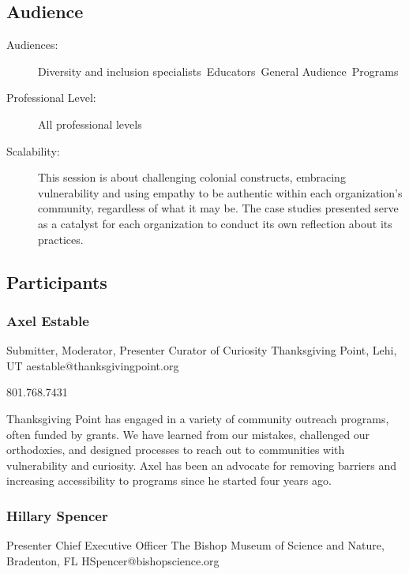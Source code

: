 \documentclass{report}
\begin{document}
              \subsection*{Audience}
                \begin{description}
                  \item [Audiences:]Diversity and inclusion specialists~Educators~General Audience~Programs~
                  \item[Professional Level:]All professional levels~
                \item[Scalability:] This session is about challenging colonial constructs, embracing vulnerability and using empathy to be authentic within each organization’s community, regardless of what it may be. The case studies presented serve as a catalyst for each organization to conduct its own reflection about its practices.

							
              \end{description}
            \subsection*{Participants}
              \subsubsection*{ Axel Estable }
              Submitter, Moderator, Presenter\newline
              Curator of Curiosity\newline
              Thanksgiving Point, Lehi, UT
              \newline
              aestable@thanksgivingpoint.org\newline
              
              801.768.7431\newline

              Thanksgiving Point has engaged in a variety of community outreach programs, often funded by grants. We have learned from our mistakes, challenged our orthodoxies, and designed processes to reach out to communities with vulnerability and curiosity. Axel has been an advocate for removing barriers and increasing accessibility to programs since he started four years ago.\newline


              

              
                \subsubsection*{ Hillary Spencer }
                Presenter\newline
                Chief Executive Officer\newline
                The Bishop Museum of Science and Nature, Bradenton, FL
                \newline
                HSpencer@bishopscience.org\newline
                
\end{document}
